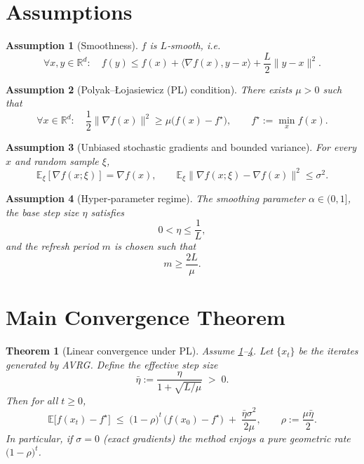\documentclass{article}
\newtheorem{theorem}{Theorem}[section]
\newtheorem{assumption}{Assumption}[section]
\begin{document}
\section*{Assumptions}
\begin{assumption}[Smoothness]\label{ass:smooth}
$f$ is $L$‑smooth, i.e.
\[
\forall x,y\in\mathbb{R}^d:\quad
f(y)\le f(x)+\langle\nabla f(x),y-x\rangle+\frac{L}{2}\|y-x\|^2 .
\]
\end{assumption}
\begin{assumption}[Polyak–Łojasiewicz (PL) condition]\label{ass:pl}
There exists $\mu>0$ such that
\[
\forall x\in\mathbb{R}^d:\quad
\frac{1}{2}\|\nabla f(x)\|^2\ge\mu\bigl(f(x)-f^\star\bigr),
\qquad f^\star:=\min_x f(x).
\]
\end{assumption}
\begin{assumption}[Unbiased stochastic gradients and bounded variance]\label{ass:stoch}
For every $x$ and random sample $\xi$,
\[
\mathbb{E}_\xi[\nabla f(x;\xi)]=\nabla f(x),\qquad
\mathbb{E}_\xi\bigl\|\nabla f(x;\xi)-\nabla f(x)\bigr\|^2\le\sigma^2 .
\]
\end{assumption}
\begin{assumption}[Hyper‑parameter regime]\label{ass:params}
The smoothing parameter $\alpha\in(0,1]$, the base step size $\eta$ satisfies
\[
0<\eta\le\frac{1}{L},
\]
and the refresh period $m$ is chosen such that
\[
m\ge \frac{2L}{\mu}.
\]
\end{assumption}

\section*{Main Convergence Theorem}
\begin{theorem}[Linear convergence under PL]\label{thm:linear}
Assume \ref{ass:smooth}–\ref{ass:params}.  Let $\{x_t\}$ be the iterates
generated by AVRG.  Define the \emph{effective step size}
\[
\bar\eta := \frac{\eta}{1+\sqrt{L/\mu}} \;>\;0 .
\]
Then for all $t\ge 0$,
\[
\mathbb{E}\!\bigl[f(x_{t})-f^\star\bigr]
\;\le\;
\bigl(1-\rho\bigr)^{t}\,\bigl(f(x_{0})-f^\star\bigr)
\;+\;
\frac{\bar\eta\sigma^2}{2\mu},
\qquad
\rho:=\frac{\mu\bar\eta}{2}.
\]
In particular, if $\sigma=0$ (exact gradients) the method enjoys a pure
geometric rate $\bigl(1-\rho\bigr)^{t}$.
\end{theorem}

\end{document}
